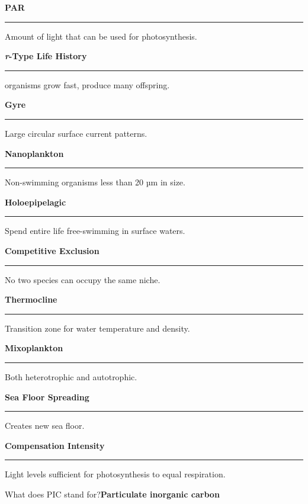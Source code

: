 \documentclass[11pt]{exam}
\newcommand*\Matching[1]{
\ifprintanswers
	\textbf{#1}
\else
	\rule{2.1in}{0.5pt}
\fi
}
\newlength\matchlena
\newlength\matchlenb
\newcommand\MatchQuestion[2]{%
	\setlength\matchlenb{\linewidth}
	\addtolength\matchlenb{-\matchlena}
	\parbox[t]{\matchlena}{\Matching{#1}}\enspace\parbox[t]{\matchlenb}{#2}}
\begin{document}
\begin{questions}

\vspace{-1\baselineskip}
\fullwidth{%

}
\vspace{0.2\baselineskip}

\question\MatchQuestion{PAR}{Amount of light that can be used for photosynthesis.}
\vspace{0.3\baselineskip}

\question\MatchQuestion{\textit{r}-Type Life History}{organisms grow fast, produce many offspring.}
\vspace{0.3\baselineskip}

\question\MatchQuestion{Gyre}{Large circular surface current patterns.}
\vspace{0.3\baselineskip}

\question\MatchQuestion{Nanoplankton}{Non-swimming organisms less than 20 µm in size.}
\vspace{0.3\baselineskip}

\question\MatchQuestion{Holoepipelagic}{Spend entire life free-swimming in surface waters.}
\vspace{0.3\baselineskip}

\question\MatchQuestion{Competitive Exclusion}{No two species can occupy the same niche.}
\vspace{0.3\baselineskip}

\question\MatchQuestion{Thermocline}{Transition zone for water temperature and density.}
\vspace{0.3\baselineskip}

\question\MatchQuestion{Mixoplankton}{Both heterotrophic and autotrophic.}
\vspace{0.3\baselineskip}

\question\MatchQuestion{Sea Floor Spreading}{Creates new sea floor.}
\vspace{0.3\baselineskip}

\question\MatchQuestion{Compensation Intensity}{Light levels sufficient for photosynthesis to equal respiration.}

\question[2]
What does PIC stand for?\ifprintanswers\newline\textbf{Particulate inorganic carbon}\vspace*{1\baselineskip}\else
\vspace*{2\baselineskip}\fi


\end{questions}
\end{document}

